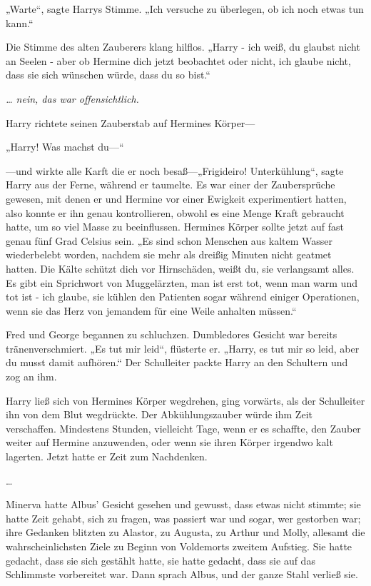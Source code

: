 {„Warte“, sagte Harrys Stimme. „Ich versuche zu überlegen, ob ich noch etwas tun kann.“

Die Stimme des alten Zauberers klang hilflos. „Harry - ich weiß, du glaubst nicht an Seelen - aber ob Hermine dich jetzt beobachtet oder nicht, ich glaube nicht, dass sie sich wünschen würde, dass du so bist.“

\emph{… nein, das war offensichtlich.}

Harry richtete seinen Zauberstab auf Hermines Körper—

„Harry! Was machst du—“

—und wirkte alle Karft die er noch besaß—„Frigideiro! Unterkühlung“, sagte Harry aus der Ferne, während er taumelte. Es war einer der Zaubersprüche gewesen, mit denen er und Hermine vor einer Ewigkeit experimentiert hatten, also konnte er ihn genau kontrollieren, obwohl es eine Menge Kraft gebraucht hatte, um so viel Masse zu beeinflussen. Hermines Körper sollte jetzt auf fast genau fünf Grad Celsius sein. „Es sind schon Menschen aus kaltem Wasser wiederbelebt worden, nachdem sie mehr als dreißig Minuten nicht geatmet hatten. Die Kälte schützt dich vor Hirnschäden, weißt du, sie verlangsamt alles. Es gibt ein Sprichwort von Muggelärzten, man ist erst tot, wenn man warm und tot ist - ich glaube, sie kühlen den Patienten sogar während einiger Operationen, wenn sie das Herz von jemandem für eine Weile anhalten müssen.“

Fred und George begannen zu schluchzen. Dumbledores Gesicht war bereits tränenverschmiert. „Es tut mir leid“, flüsterte er. „Harry, es tut mir so leid, aber du musst damit aufhören.“ Der Schulleiter packte Harry an den Schultern und zog an ihm.

Harry ließ sich von Hermines Körper wegdrehen, ging vorwärts, als der Schulleiter ihn von dem Blut wegdrückte. Der Abkühlungszauber würde ihm Zeit verschaffen. Mindestens Stunden, vielleicht Tage, wenn er es schaffte, den Zauber weiter auf Hermine anzuwenden, oder wenn sie ihren Körper irgendwo kalt lagerten. Jetzt hatte er Zeit zum Nachdenken.

…

Minerva hatte Albus' Gesicht gesehen und gewusst, dass etwas nicht stimmte; sie hatte Zeit gehabt, sich zu fragen, was passiert war und sogar, wer gestorben war; ihre Gedanken blitzten zu Alastor, zu Augusta, zu Arthur und Molly, allesamt die wahrscheinlichsten Ziele zu Beginn von Voldemorts zweitem Aufstieg. Sie hatte gedacht, dass sie sich gestählt hatte, sie hatte gedacht, dass sie auf das Schlimmste vorbereitet war. Dann sprach Albus, und der ganze Stahl verließ sie.

}
